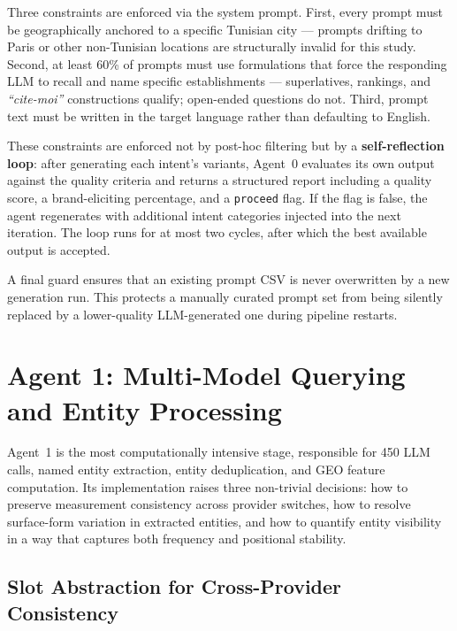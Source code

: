 Three constraints are enforced via the system prompt. First, every prompt must be
geographically anchored to a specific Tunisian city — prompts drifting to Paris or
other non-Tunisian locations are structurally invalid for this study. Second, at
least 60\% of prompts must use formulations that force the responding LLM to recall
and name specific establishments — superlatives, rankings, and \textit{``cite-moi''}
constructions qualify; open-ended questions do not. Third, prompt text must be
written in the target language rather than defaulting to English.

These constraints are enforced not by post-hoc filtering but by a \textbf{self-reflection
loop}: after generating each intent's variants, Agent~0 evaluates its own output
against the quality criteria and returns a structured report including a quality score,
a brand-eliciting percentage, and a \texttt{proceed} flag. If the flag is false, the
agent regenerates with additional intent categories injected into the next iteration.
The loop runs for at most two cycles, after which the best available output is accepted.

A final guard ensures that an existing prompt CSV is never overwritten by a new
generation run. This protects a manually curated prompt set from being silently
replaced by a lower-quality LLM-generated one during pipeline restarts.

\section{Agent 1: Multi-Model Querying and Entity Processing}
\label{sec:agent1impl}

Agent~1 is the most computationally intensive stage, responsible for 450 LLM calls,
named entity extraction, entity deduplication, and GEO feature computation.
Its implementation raises three non-trivial decisions: how to preserve measurement
consistency across provider switches, how to resolve surface-form variation in
extracted entities, and how to quantify entity visibility in a way that captures
both frequency and positional stability.

\subsection{Slot Abstraction for Cross-Provider Consistency}

